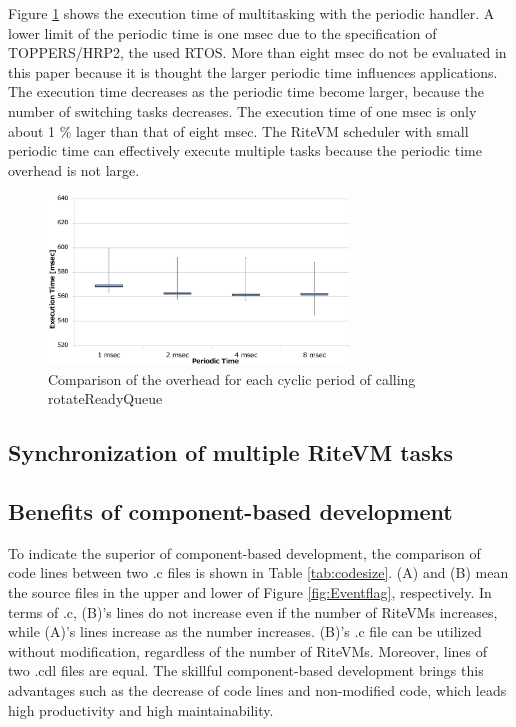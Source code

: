 \documentclass{sig-alternate-05-2015}
\begin{document}
Figure \ref{fig:comparison_msec} shows the execution time of multitasking with the periodic handler.
A lower limit of the periodic time is one msec due to the specification of TOPPERS/HRP2, the used RTOS.
More than eight msec do not be evaluated in this paper because it is thought the larger periodic time influences applications.
The execution time decreases as the periodic time become larger, because the number of switching tasks decreases.
The execution time of one msec is only about 1 \% lager than that of eight msec.
The RiteVM scheduler with small periodic time can effectively execute multiple tasks because the periodic time overhead is not large.

\begin{figure}[t]
    \centering
    \includegraphics[width=8cm,clip]{figure/comparison_msec.eps}
    \caption{Comparison of the overhead for each cyclic period of calling rotateReadyQueue}
    \label{fig:comparison_msec}
\end{figure}

\subsection{Synchronization of multiple RiteVM tasks}

\subsection{Benefits of component-based development}
To indicate the superior of component-based development, the comparison of code lines between two .c files is shown in Table \ref{tab:codesize}.
(A) and (B) mean the source files in the upper and lower of Figure \ref{fig:Eventflag}, respectively. 
In terms of .c, (B)'s lines do not increase even if the number of RiteVMs increases, while (A)'s lines increase as the number increases.
(B)'s .c file can be utilized without modification, regardless of the number of RiteVMs.
Moreover, lines of two .cdl files are equal.
The skillful component-based development brings this advantages such as the decrease of code lines and non-modified code, which leads high productivity and high maintainability.
\end{document}
